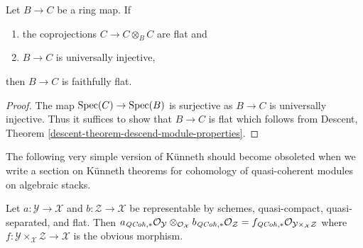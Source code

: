 \begin{lemma}
\label{lemma-flat}
Let $B \to C$ be a ring map. If
\begin{enumerate}
\item the coprojections $C \to C \otimes_B C$ are flat and
\item $B \to C$ is universally injective,
\end{enumerate}
then $B \to C$ is faithfully flat.
\end{lemma}

\begin{proof}
The map $\mathop{\mathrm{Spec}}(C) \to \mathop{\mathrm{Spec}}(B)$ is surjective as $B \to C$ is universally
injective. Thus it suffices to show that $B \to C$ is flat
which follows from
Descent, Theorem \ref{descent-theorem-descend-module-properties}.
\end{proof}

\noindent
The following very simple version of K\"unneth should become
obsoleted when we write a section on K\"unneth theorems for
cohomology of quasi-coherent modules on algebraic stacks.

\begin{lemma}
\label{lemma-easy-kunneth}
Let $a : \mathcal{Y} \to \mathcal{X}$ and $b : \mathcal{Z} \to \mathcal{X}$
be representable by schemes, quasi-compact, quasi-separated, and flat.
Then $a_{\mathit{QCoh}, *}\mathcal{O}_\mathcal{Y}
\otimes_{\mathcal{O}_\mathcal{X}}
b_{\mathit{QCoh}, *}\mathcal{O}_\mathcal{Z} =
f_{\mathit{QCoh}, *}\mathcal{O}_{\mathcal{Y} \times_\mathcal{X} \mathcal{Z}}$
where $f : \mathcal{Y} \times_\mathcal{X} \mathcal{Z} \to \mathcal{X}$
is the obvious morphism.
\end{lemma}

